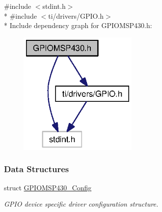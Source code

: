{\ttfamily \#include $<$stdint.\+h$>$}\\*
{\ttfamily \#include $<$ti/drivers/\+G\+P\+I\+O.\+h$>$}\\*
Include dependency graph for G\+P\+I\+O\+M\+S\+P430.\+h\+:
\nopagebreak
\begin{figure}[H]
\begin{center}
\leavevmode
\includegraphics[width=165pt]{_g_p_i_o_m_s_p430_8h__incl}
\end{center}
\end{figure}
\subsubsection*{Data Structures}
\begin{DoxyCompactItemize}
\item 
struct \hyperlink{struct_g_p_i_o_m_s_p430___config}{G\+P\+I\+O\+M\+S\+P430\+\_\+\+Config}
\begin{DoxyCompactList}\small\item\em G\+P\+I\+O device specific driver configuration structure. \end{DoxyCompactList}\end{DoxyCompactItemize}
